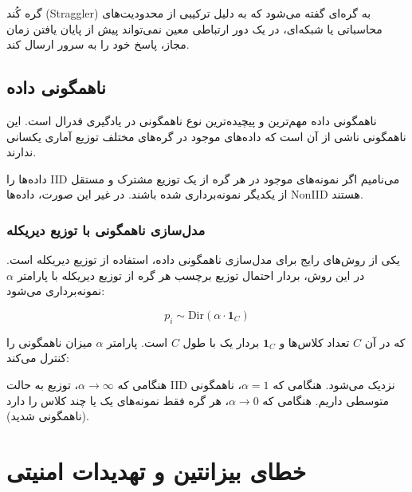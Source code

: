 \begin{ntdefinition}
گره کُند (\gls{Straggler}) به گره‌ای گفته می‌شود که به دلیل ترکیبی از محدودیت‌های محاسباتی یا شبکه‌ای، در یک دور ارتباطی معین نمی‌تواند پیش از پایان یافتن زمان مجاز، پاسخ خود را به سرور ارسال کند.
\end{ntdefinition}

\subsection{ناهمگونی داده}

ناهمگونی داده مهم‌ترین و پیچیده‌ترین نوع ناهمگونی در یادگیری فدرال است. این ناهمگونی ناشی از آن است که داده‌های موجود در گره‌های مختلف توزیع آماری یکسانی ندارند.

\begin{ntdefinition}
داده‌ها را \gls{IID} می‌نامیم اگر نمونه‌های موجود در هر گره از یک توزیع مشترک و مستقل از یکدیگر نمونه‌برداری شده باشند. در غیر این صورت، داده‌ها \gls{NonIID} هستند.
\end{ntdefinition}

\subsubsection{مدل‌سازی ناهمگونی با توزیع دیریکله}

یکی از روش‌های رایج برای مدل‌سازی ناهمگونی داده، استفاده از توزیع دیریکله است. در این روش، بردار احتمال توزیع برچسب هر گره از توزیع دیریکله با پارامتر $\alpha$ نمونه‌برداری می‌شود:

\begin{equation}
    p_i \sim \text{Dir}(\alpha \cdot \mathbf{1}_C)
    \label{eq:dirichlet}
\end{equation}

که در آن $C$ تعداد کلاس‌ها و $\mathbf{1}_C$ بردار یک با طول $C$ است. پارامتر $\alpha$ میزان ناهمگونی را کنترل می‌کند:

\begin{itemize}
    \tick هنگامی که $\alpha \to \infty$، توزیع به حالت \gls{IID} نزدیک می‌شود.
    \tick هنگامی که $\alpha = 1$، ناهمگونی متوسطی داریم.
    \tick هنگامی که $\alpha \to 0$، هر گره فقط نمونه‌های یک یا چند کلاس را دارد (ناهمگونی شدید).
\end{itemize}


\section{خطای بیزانتین و تهدیدات امنیتی}
\label{sec:byzantine}

